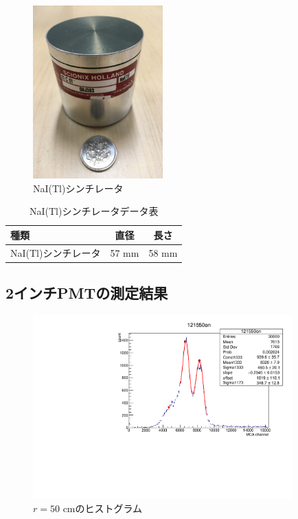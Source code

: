 \begin{figure}[h]
	\centering
	\includegraphics[width=5cm]{fig/iguchi/NaIscinti.jpg}
	\caption{NaI(Tl)シンチレータ}
	\label{NaIscinti}
\end{figure}

\begin{table}[h]
	\centering
	 \begin{tabular}{lcc}\hline
	種類& 直径 & 長さ \\ \hline \hline
	NaI(Tl)シンチレータ & 57 mm & 58 mm \\ \hline
	\end{tabular}
	  \caption{NaI(Tl)シンチレータデータ表}
\end{table}     
 
\subsection{2インチPMTの測定結果}

\begin{figure}[h]
	\centering
	\includegraphics[angle=-90,width=10cm]{fig/iguchi/121550on.pdf}
	\caption{$r=50$ cmのヒストグラム}
	\label{hist50}
\end{figure}

